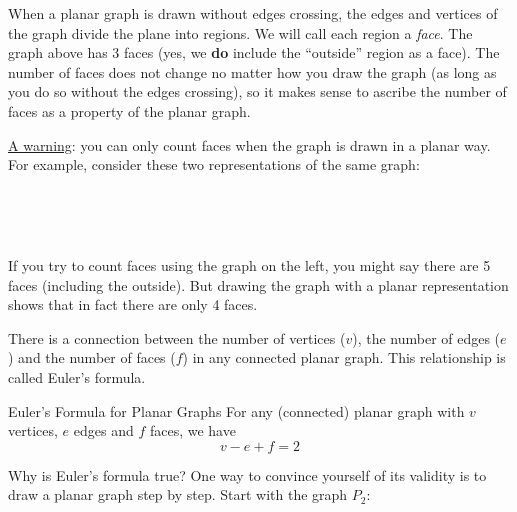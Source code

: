 \documentclass[12pt]{article}
\begin{document}
When a planar graph is drawn without edges crossing, the edges and vertices of the graph divide the plane into regions.  We will call each region a {\em face}.  The graph above has 3 faces (yes, we \textbf{do} include the ``outside'' region as a face).  The number of faces does not change no matter how you draw the graph (as long as you do so without the edges crossing), so it makes sense to ascribe the number of faces as a property of the planar graph.

\underline{A warning}: you can only count faces when the graph is drawn in a planar way.  For example, consider these two representations of the same graph:

\begin{center}
 ~ \hfill
  \hfill
  \hfill ~
\end{center}

If you try to count faces using the graph on the left, you might say there are 5 faces (including the outside).  But drawing the graph with a planar representation shows that in fact there are only 4 faces.



There is a connection between the number of vertices ($v$), the number of edges ($e$) and the number of faces ($f$) in any connected planar graph.  This relationship is called Euler's formula.

\begin{defbox}{Euler's Formula for Planar Graphs}
For any (connected) planar graph with $v$ vertices, $e$ edges and $f$ faces, we have
\[v-e + f = 2\]
\end{defbox}

Why is Euler's formula true?  One way to convince yourself of its validity is to draw a planar graph step by step.  Start with the graph $P_2$:

\begin{center}
\end{center}
\end{document}
